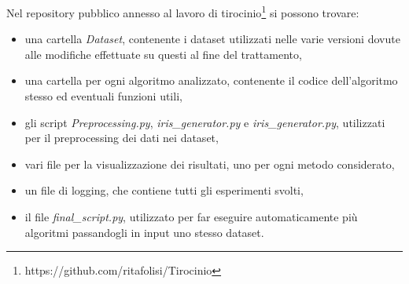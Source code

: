 \documentclass[oneside, openany]{book}
\begin{document}
	Nel repository pubblico annesso al lavoro di tirocinio\footnote{https://github.com/ritafolisi/Tirocinio} si possono trovare:
	\begin{itemize}
		\item una cartella \textit{Dataset}, contenente i dataset utilizzati nelle varie versioni dovute alle modifiche effettuate su questi al fine del trattamento,
		\item una cartella per ogni algoritmo analizzato, contenente il codice dell'algoritmo stesso ed eventuali funzioni utili,
		\item gli script \textit{Preprocessing.py}, \textit{iris\_generator.py} e \textit{iris\_generator.py}, utilizzati per il preprocessing dei dati nei dataset,
		\item vari file per la visualizzazione dei risultati, uno per ogni metodo considerato,
		\item un file di logging, che contiene tutti gli esperimenti svolti,
		\item il file \textit{final\_script.py}, utilizzato per far eseguire automaticamente più algoritmi passandogli in input uno stesso dataset. 
	\end{itemize}
	
\end{document}
